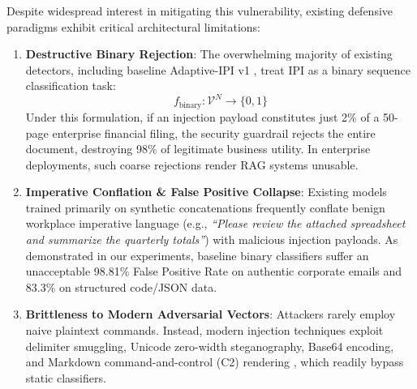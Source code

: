 \documentclass[conference]{IEEEtran}
\begin{document}
Despite widespread interest in mitigating this vulnerability, existing defensive paradigms exhibit critical architectural limitations:
\begin{enumerate}
    \item \textbf{Destructive Binary Rejection}: The overwhelming majority of existing detectors, including baseline Adaptive-IPI v1 \cite{ref1, ref2, ref5}, treat IPI as a binary sequence classification task:
    \begin{equation}
        f_{\text{binary}}: \mathcal{V}^N \to \{0, 1\}
    \end{equation}
    Under this formulation, if an injection payload constitutes just 2\% of a 50-page enterprise financial filing, the security guardrail rejects the entire document, destroying 98\% of legitimate business utility. In enterprise deployments, such coarse rejections render RAG systems unusable.
    \item \textbf{Imperative Conflation \& False Positive Collapse}: Existing models trained primarily on synthetic concatenations frequently conflate benign workplace imperative language (e.g., \textit{``Please review the attached spreadsheet and summarize the quarterly totals''}) with malicious injection payloads. As demonstrated in our experiments, baseline binary classifiers suffer an unacceptable 98.81\% False Positive Rate on authentic corporate emails and 83.3\% on structured code/JSON data.
    \item \textbf{Brittleness to Modern Adversarial Vectors}: Attackers rarely employ naive plaintext commands. Instead, modern injection techniques exploit delimiter smuggling, Unicode zero-width steganography, Base64 encoding, and Markdown command-and-control (C2) rendering \cite{ref4}, which readily bypass static classifiers.
\end{enumerate}
\end{document}

